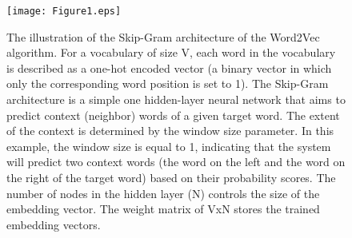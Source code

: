 \documentclass[review]{elsarticle}
\begin{document}
\begin{figure}[H]%
\centerline{\texttt{[image: Figure1.eps]}} %
\caption{ The illustration of the Skip-Gram architecture of the Word2Vec algorithm. For a vocabulary of size V, each word in the vocabulary is described as a one-hot encoded vector (a binary vector in which only the corresponding word position is set to 1). The Skip-Gram architecture is a simple one hidden-layer neural network that aims to predict context (neighbor) words of a given target word. The extent of the context is determined by the window size parameter. In this example, the window size is equal to 1, indicating that the system will predict two context words (the word on the left and the word on the right of the target word) based on their probability scores. The number of nodes in the hidden layer (N) controls the size of the embedding vector. The weight matrix of VxN stores the trained embedding vectors.  }\label{fig:word2vec}
\end{figure}
\end{document}
